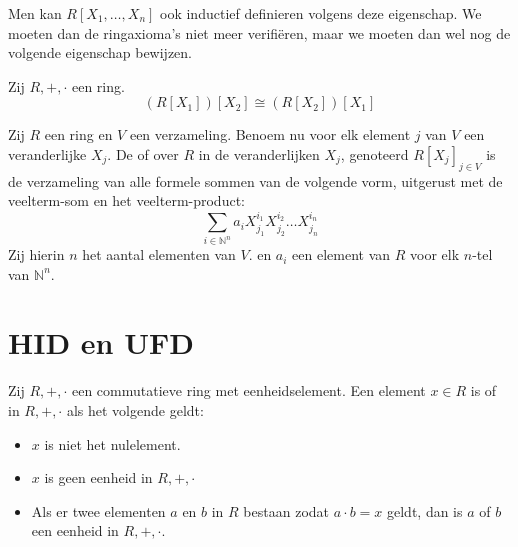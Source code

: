 \documentclass[main.tex]{subfiles}
\begin{document}
\begin{opm}
  Men kan $R[X_{1},\dotsc,X_{n}]$ ook inductief definieren volgens deze eigenschap.
  We moeten dan de ringaxioma's niet meer verifi\"eren, maar we moeten dan wel nog de volgende eigenschap bewijzen.
\end{opm}

\begin{ei}
  Zij $R,+,\cdot$ een ring.
  \[ (R[X_{1}])[X_{2}] \cong (R[X_{2}])[X_{1}] \]
\end{ei}

\begin{de}
  Zij $R$ een ring en $V$ een verzameling.
  Benoem nu voor elk element $j$ van $V$ een veranderlijke $X_{j}$.
  De  of  over $R$ in de veranderlijken $X_{j}$, genoteerd $R[X_{j}]_{j\in V}$ is de verzameling van alle formele sommen van de volgende vorm, uitgerust met de veelterm-som en het veelterm-product:
  \[ \sum_{i\in \mathbb{N}^{n}}a_{i}X_{j_{1}}^{i_{1}}X_{j_{2}}^{i_{2}}\dotsc X_{j_{n}}^{i_{n}}\]
  Zij hierin $n$ het aantal elementen van $V$. en $a_{i}$ een element van $R$ voor elk $n$-tel van $\mathbb{N}^{n}$. 
\end{de}

\section{HID en UFD}
\label{sec:hid-en-ufd}

\begin{de}
  Zij $R,+,\cdot$ een commutatieve ring met eenheidselement.
  Een element $x\in R$ is  of  in $R,+,\cdot$ als het volgende geldt:
  \begin{itemize}
  \item $x$ is niet het nulelement.
  \item $x$ is geen eenheid in $R,+,\cdot$
  \item Als er twee elementen $a$ en $b$ in $R$ bestaan zodat $a\cdot b = x$ geldt, dan is $a$ of $b$ een eenheid in $R,+,\cdot$.
  \end{itemize}
\end{de}
\end{document}
